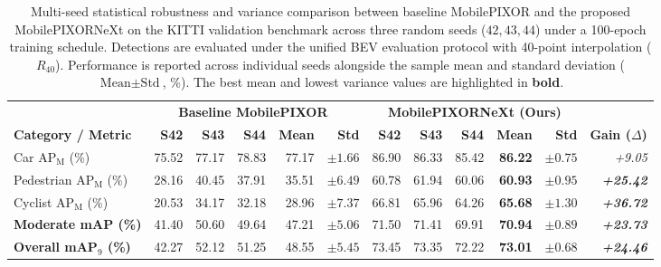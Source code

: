 \begin{table}[t]
\centering\small
\caption{Multi-seed statistical robustness and variance comparison between baseline MobilePIXOR and the proposed MobilePIXORNeXt on the KITTI validation benchmark across three random seeds ($42, 43, 44$) under a 100-epoch training schedule. Detections are evaluated under the unified BEV evaluation protocol with 40-point interpolation ($R_{40}$). Performance is reported across individual seeds alongside the sample mean and standard deviation ($\text{Mean} \pm \text{Std}$, \%). The best mean and lowest variance values are highlighted in \textbf{bold}.}
\label{tab:seed_robustness}
\setlength{\tabcolsep}{4.5pt}
\begin{tabular}{@{}lrrrrrrrrrrr@{}}
\toprule
& \multicolumn{5}{c}{\textbf{Baseline MobilePIXOR~\cite{nguyen2024indoor}}} & \multicolumn{5}{c}{\textbf{MobilePIXORNeXt (Ours)}} & \\
\cmidrule(lr){2-6} \cmidrule(lr){7-11}
\textbf{Category / Metric} & \textbf{S42} & \textbf{S43} & \textbf{S44} & \textbf{Mean} & \textbf{Std} & \textbf{S42} & \textbf{S43} & \textbf{S44} & \textbf{Mean} & \textbf{Std} & \textbf{Gain ($\Delta$)} \\
\midrule
Car AP$_{\mathrm{M}}$ (\%) & 75.52 & 77.17 & 78.83 & 77.17 & $\pm 1.66$ & 86.90 & 86.33 & 85.42 & \textbf{86.22} & $\mathbf{\pm 0.75}$ & \textit{+9.05} \\
Pedestrian AP$_{\mathrm{M}}$ (\%) & 28.16 & 40.45 & 37.91 & 35.51 & $\pm 6.49$ & 60.78 & 61.94 & 60.06 & \textbf{60.93} & $\mathbf{\pm 0.95}$ & \textit{\textbf{+25.42}} \\
Cyclist AP$_{\mathrm{M}}$ (\%) & 20.53 & 34.17 & 32.18 & 28.96 & $\pm 7.37$ & 66.81 & 65.96 & 64.26 & \textbf{65.68} & $\mathbf{\pm 1.30}$ & \textit{\textbf{+36.72}} \\
\midrule
\textbf{Moderate mAP (\%)} & 41.40 & 50.60 & 49.64 & 47.21 & $\pm 5.06$ & 71.50 & 71.41 & 69.91 & \textbf{70.94} & $\mathbf{\pm 0.89}$ & \textit{\textbf{+23.73}} \\
\textbf{Overall mAP$_{9}$ (\%)} & 42.27 & 52.12 & 51.25 & 48.55 & $\pm 5.45$ & 73.45 & 73.35 & 72.22 & \textbf{73.01} & $\mathbf{\pm 0.68}$ & \textit{\textbf{+24.46}} \\
\bottomrule
\end{tabular}
\end{table}

